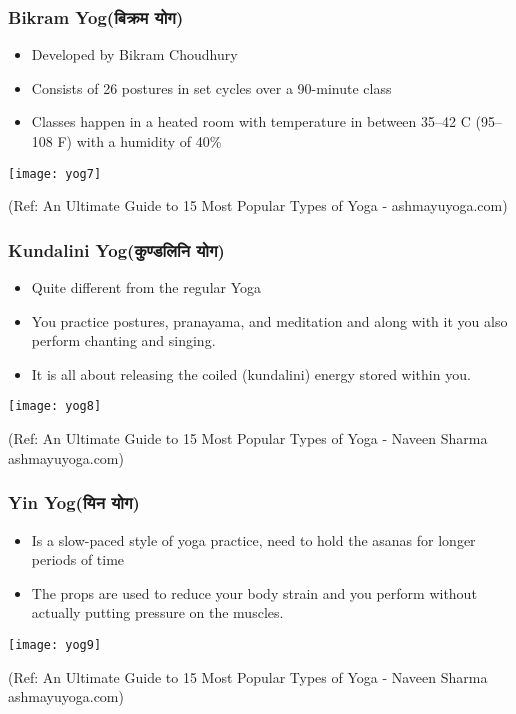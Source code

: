 \begin{frame}[fragile]\frametitle{Bikram Yog(बिक्रम योग)}
	\begin{itemize}
	\item Developed by Bikram Choudhury
	\item Consists of 26 postures in set cycles over a 90-minute class
	\item Classes happen in a heated room with temperature in between 35–42 C (95–108 F) with a humidity of 40\%
	\end{itemize}

\begin{center}
\texttt{[image: yog7]}

\tiny{(Ref: An Ultimate Guide to 15 Most Popular Types of Yoga - ashmayuyoga.com)}
\end{center}

\end{frame}

\begin{frame}[fragile]\frametitle{Kundalini Yog(कुण्डलिनि योग)}
	\begin{itemize}
	\item Quite different from the regular Yoga
	\item You practice postures, pranayama, and meditation and along with it you also perform chanting and singing. 
	\item It is all about releasing the coiled (kundalini) energy stored within you.
	\end{itemize}

\begin{center}
\texttt{[image: yog8]}

\tiny{(Ref: An Ultimate Guide to 15 Most Popular Types of Yoga - Naveen Sharma ashmayuyoga.com)}
\end{center}

\end{frame}

\begin{frame}[fragile]\frametitle{Yin Yog(यिन योग)}
	\begin{itemize}
	\item Is a slow-paced style of yoga practice, need to hold the asanas for longer periods of time
	\item The props are used to reduce your body strain and you perform without actually putting pressure on the muscles.
	\end{itemize}

\begin{center}
\texttt{[image: yog9]}

\tiny{(Ref: An Ultimate Guide to 15 Most Popular Types of Yoga - Naveen Sharma ashmayuyoga.com)}
\end{center}

\end{frame}


